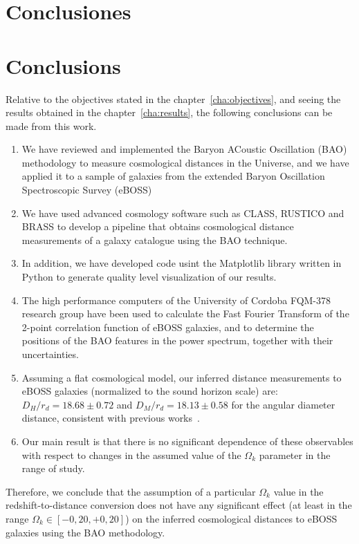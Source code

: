\chapter*{Conclusiones}


\chapter*{Conclusions}

Relative to the objectives stated in the chapter~\ref{cha:objectives}, and seeing the results obtained in the chapter~\ref{cha:results}, the following conclusions can be made from this work.

\begin{enumerate}
	\item We have reviewed and implemented the Baryon ACoustic Oscillation (BAO) methodology to measure cosmological distances in the Universe, and we have applied it to a sample of galaxies from the extended Baryon Oscillation Spectroscopic Survey (eBOSS)
	\item We have used advanced cosmology software such as CLASS, RUSTICO and BRASS to develop a pipeline that obtains cosmological distance measurements of a galaxy catalogue using the BAO technique.
	\item In addition, we have developed code usint the Matplotlib library written in Python to generate quality level visualization of our results.
	\item The high performance computers of the University of Cordoba FQM-378 research group have been used to calculate the Fast Fourier Transform of the 2-point correlation function of eBOSS galaxies, and to determine the positions of the BAO features in the power spectrum, together with their uncertainties.
	\item Assuming a flat cosmological model, our inferred distance measurements to eBOSS galaxies (normalized to the sound horizon scale) are: $D_H/r_d = 18.68 \pm 0.72$ and $D_M/r_d = 18.13 \pm 0.58$ for the angular diameter distance, consistent with previous works~\cite{hector}.
	\item Our main result is that there is no significant dependence of these observables with respect to changes in the assumed value of the $\Omega_k$ parameter in the range of study.
\end{enumerate}

Therefore, we conclude that the assumption of a particular $\Omega_k$ value in the redshift-to-distance conversion does not have any significant effect (at least in the range $\Omega_k \in [-0,20, +0,20]$) on the inferred cosmological distances to eBOSS galaxies using the BAO methodology.

